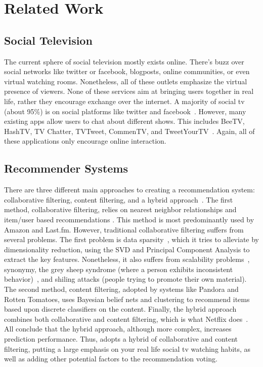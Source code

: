 \section{Related Work}

\subsection{Social Television}
The current sphere of social television mostly exists online.  There’s
buzz over social networks like twitter or facebook, blogposts, online
communities, or even virtual watching rooms.  Nonetheless, all of
these outlets emphasize the virtual presence of viewers.  None of
these services aim at bringing users together in real life, rather
they encourage exchange over the internet.  A majority of social tv
(about 95\%) is on social platforms like twitter and
facebook~\cite{chausse}.  However, many existing apps allow users to
chat about different shows.  This includes BeeTV, HashTV, TV Chatter,
TVTweet, CommenTV, and TweetYourTV~\cite{chausse}.  Again, all of
these applications only encourage online interaction.

\subsection{Recommender Systems} 
\label{sec:recommender}
There are three different main approaches to creating a recommendation
system: collaborative filtering, content filtering, and a hybrid
approach~\cite{su,vozalis}.  The first method, collaborative
filtering, relies on nearest neighbor relationships and item/user
based recommendations \cite{su}.  This method is most predominantly
used by Amazon and Last.fm.  However, traditional collaborative
filtering suffers from several problems.  The first problem is data
sparsity~\cite{su,melville}, which it tries to alleviate by
dimensionality reduction, using the SVD and Principal Component
Analysis to extract the key features.  Nonetheless, it also suffers
from scalability problems~\cite{papagelis}, synonymy, the grey sheep
syndrome (where a person exhibits inconsistent behavior)~\cite{su},
and shiling attacks (people trying to promote their own material).
The second method, content filtering, adopted by systems like Pandora
and Rotten Tomatoes, uses Bayesian belief nets and clustering to
recommend items based upon discrete classifiers on the content.
Finally, the hybrid approach combines both collaborative and content
filtering, which is what Netflix does~\cite{su,melville}.  All
conclude that the hybrid approach, although more complex, increases
prediction performance.  Thus, {\sys} adopts a hybrid of collaborative
and content filtering, putting a large emphasis on your real life
social tv watching habits, as well as adding other potential factors
to the recommendation voting.

